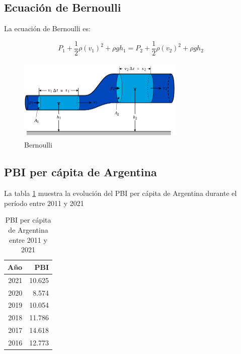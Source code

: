 \documentclass[runningheads]{llncs}
\begin{document}
\hypertarget{ecuaciuxf3n-de-bernoulli}{%
\subsection{Ecuación de Bernoulli}\label{ecuaciuxf3n-de-bernoulli}}

La ecuación de Bernoulli es:

\begin{equation}
P_1 + \frac{1}{2} \rho (v_1)^2 + \rho g h_1 = P_2 + \frac{1}{2} \rho (v_2)^2 + \rho g h_2 
\end{equation}

\begin{figure}
\centering
\includegraphics[width=3.125in,height=1.5625in]{BernoullisLawDerivationDiagram.svg.png}
\caption{Bernoulli}
\end{figure}

\hypertarget{pbi-per-cuxe1pita-de-argentina}{%
\subsection{PBI per cápita de
Argentina}\label{pbi-per-cuxe1pita-de-argentina}}

La tabla \ref{tab:table} muestra la evolución del PBI per cápita de
Argentina durante el período entre 2011 y 2021

\begin{table}

\caption{\label{tab:table}PBI per cápita de Argentina entre 2011 y 2021}
\centering
\begin{tabular}[t]{r|r}
\hline
Año & PBI\\
\hline
2021 & 10.625\\
\hline
2020 & 8.574\\
\hline
2019 & 10.054\\
\hline
2018 & 11.786\\
\hline
2017 & 14.618\\
\hline
2016 & 12.773\\
\hline
\end{tabular}
\end{table}

%
\end{document}
